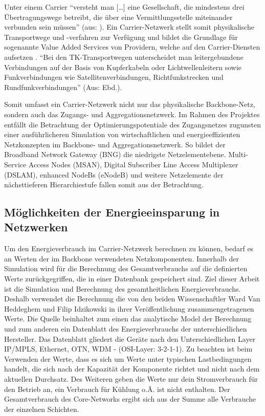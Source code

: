 \documentclass[12pt,titlepage]{article}
\begin{document}
Unter einem Carrier "`versteht man […] eine Gesellschaft, die mindestens drei Übertra\-gungs\-wege betreibt, die über eine Vermittlungsstelle miteinander verbunden sein müssen"' (aus: \cite{carrier}). Ein Carrier-Netzwerk stellt somit physikalische Transportwege und -verfahren zur Verfügung und bildet die Grundlage für sogenannte Value Added Services von Providern, welche auf den Carrier-Diensten aufsetzen \cite{fassnacht}. "`Bei den TK-Transportwegen unterscheidet man leitergebundene Verbindungen auf der Basis von Kupferkabeln oder Lichtwellenleitern sowie Funkverbindungen wie Satellitenverbindungen, Richtfunkstrecken und Rundfunkverbindungen"' (Aus: Ebd.).%

Somit umfasst ein Carrier-Netzwerk nicht nur das physikalische Backbone-Netz, sondern auch das Zugangs- und Aggregationsnetzwerk. Im Rahmen des Projektes entfällt die Betrachtung der Optimierungspotentiale des Zugangsnetzes zugunsten einer aus\-führ\-lich\-eren Simulation von wirtschaftlichen und energieeffizienten Netzkonzepten im Backbone- und Aggregationsnetzwerk. So bildet der Broadband Network Gateway (BNG) die niedrigste Netzelementebene. Multi-Service Access Nodes (MSAN), Digital Subscriber Line Access Multiplexer (DSLAM), enhanced NodeBs (eNodeB) und weitere Netzelemente der nächsttieferen Hierarchiestufe fallen somit aus der Betrachtung.
\subsection{Möglichkeiten der Energieeinsparung in Netzwerken}

Um den Energieverbrauch im Carrier-Netzwerk berechnen zu können, bedarf es an Werten der im Backbone verwendeten Netzkomponenten. Innerhalb der Simulation wird für die Berechnung des Gesamtverbrauchs auf die definierten Werte zurückgegriffen, die in einer Datenbank gespeichert sind. Ziel dieser Arbeit ist die Simulation und Berechnung des gesamtheitlichen Energieverbrauchs. Deshalb verwendet die Berechnung die von den beiden Wissenschaftler Ward Van Heddeghem und Filip Idzikowski in ihrer Veröffentlichung \cite{vanhedde} zusammengetragenen Werte. Die Quelle beinhaltet zum einen das analytische Model der Berechnung und zum anderen ein Datenblatt \cite{vanhsheet} des Energieverbrauchs der unterschiedlichen Hersteller. Das Datenblatt gliedert die Geräte nach den Unterschiedlichen Layer IP/MPLS, Ethernet, OTN, WDM - (OSI-Layer: 3-2-1-1). Zu beachten ist beim Verwenden der Werte, dass es sich um Werte unter typischen Lastbedingungen handelt, die sich nach der Kapazität der Komponente richtet und nicht nach dem aktuellen Durchsatz. Des Weiteren geben die Werte nur dein Stromverbrauch für den Betrieb an, ein Verbrauch für Kühlung o.Ä. ist nicht enthalten.
Der Gesamtverbrauch des Core-Networks ergibt sich aus der Summe alle Verbrauche der einzelnen Schichten. 
\end{document}
